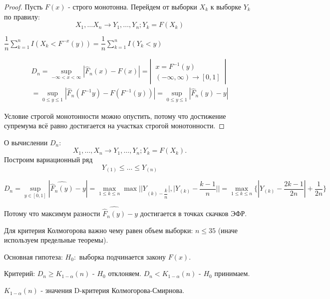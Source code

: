 \begin{proof}
  Пусть $F(x)$ - строго монотонна. Перейдем от выборки $X_k$ к выборке $Y_k$ по правилу:
  \[
    X_1, \dots X_n \to Y_1, \dots, Y_n; Y_k = F(X_k)
  \]

  $\dfrac{1}{n} \sum_{k=1}^n I(X_k < F^{-x} (y)) = \dfrac{1}{n} \sum_{k=1}^n I(Y_k < y)$

  \begin{multline*}
    D_n = \sup_{-\infty < x < \infty} |\hat F_n(x) - F(x)|
    = \left|\, \begin{aligned}
      x = F^{-1} (y) \\
      (-\infty, \infty) \to [0, 1]
    \end{aligned} \,\right|\\ 
    = \sup_{0 \leqslant y \leqslant 1} |\hat F_n (F^{-1} y) - F(F^{-1} (y))|
    = \sup_{0\leqslant y \leqslant 1} |\hat F_n(y) - y|
  \end{multline*}

  Условие строгой монотонности можно опустить, потому что достижение супремума всё равно достигается на участках строгой монотонности.
\end{proof}

О вычислении $D_n$:
\[
  X_1, \dots, X_n \to Y_1, \dots, Y_n; Y_k = F(X_k).
\]
Построим вариационный ряд
\[
  Y_{(1)} \leqslant \dots \leqslant Y_{(n)}
\]

\[
  D_n = \sup_{y \in [0, 1]} |\hat{\hat F_n(y)} - y|
  = \max_{1\leqslant k \leqslant n} \max | |Y_{(k) - \dfrac{k}{n}}|, |Y_{(k)} - \dfrac{k-1}{n}| |
  = \max_{1 \leqslant k \leqslant n} \{ |Y_{(k)} - \dfrac{2k-1}{2n}| + \dfrac{1}{2n} \}
\]

Потому что максимум разности $\hat{\hat F_n(y)} - y$ достигается в точках скачков ЭФР.

Для критерия Колмогорова важно чему равен объем выборки: $n\leqslant 35$ (иначе используем предельные теоремы).

Основная гипотеза: $H_0:$ выборка подчинается закону $F(x)$.

Критерий: $D_n \geqslant K_{1-\alpha} (n)$ - $H_0$ отклоняем.
  $D_n < K_{1-\alpha} (n)$ - $H_0$ принимаем. 

$K_{1-\alpha} (n)$ - значения D-критерия Колмогорова-Смирнова.

